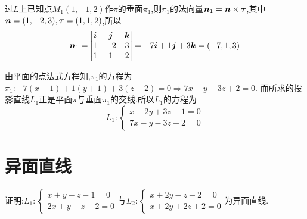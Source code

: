 \begin{solution}

    过$L$上已知点$M_1(1,-1,2)$作$\pi$的垂面$\pi_1$,则$\pi_1$的法向量$\bm{n}_1 = \bm{n} \times \bm \tau$,其中$\bm{n} = (1,-2,3),\bm \tau = (1,1,2)$,所以
    $$\bm{n}_1 = \begin{vmatrix}
        \bm{i} & \bm{j} & \bm{k} \\
        1 & -2 & 3 \\
        1 & 1 & 2 
    \end{vmatrix} = -7\bm{i} + 1 \bm{j} + 3\bm{k} = (-7,1,3)$$

    由平面的点法式方程知,$\pi_1$的方程为$\pi_1: -7(x-1)+1(y+1)+3(z-2) = 0 \Rightarrow 7x-y-3z+2 = 0$.
    而所求的投影直线$L_1$正是平面$\pi$与垂面$\pi_1$的交线,所以$L_1$的方程为
    $$
    L_1:\begin{cases}
        x-2y+3z+1 = 0 \\
        7x-y-3z+2 = 0
    \end{cases}
    $$
\end{solution}

\section{异面直线}

\begin{example}
    证明:$L_1: \begin{cases}
    x+y-z-1=0\\
    2x+y-z-2=0
    \end{cases}$与$L_2: \begin{cases}
        x+2y-z-2=0\\
        x+2y+2z+2=0
    \end{cases}$为异面直线.
\end{example}

